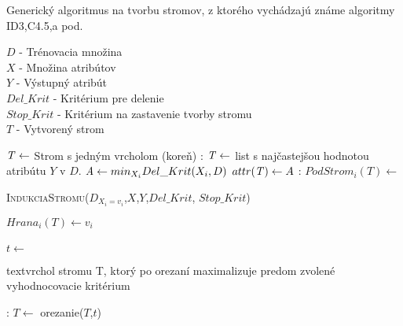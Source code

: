 \begin{algorithm} 
\caption{Generický algoritmus na tvorbu stromov, z ktorého vychádzajú známe algoritmy ID3,C4.5,a pod.}\label{fig:genericAlgoritm}
$D$ - Trénovacia množina \\
$X$ - Množina atribútov \\
$Y$ - Výstupný atribút \\
$Del\_Krit$ - Kritérium pre delenie \\
$Stop\_Krit$ - Kritérium na zastavenie tvorby stromu \\
$T$ - Vytvorený strom 
\begin{algorithmic}
\State $\mathit{T} \gets $ Strom s jedným vrcholom (koreň)
:	  
\State $\mathit{T} \gets $ list s najčastejšou hodnotou atribútu $Y$ v $D$.
\Else
\State $\mathit{A} \gets min_{X_{i}}Del\_Krit(X_{i},D)$
\State $attr(\mathit{T}) \gets A$
\EndIf
{}:
\State $PodStrom_{i}(T) \gets $ \parbox[t]{280pt}{\textsc{IndukciaStromu}($D_{X_{i} = v_{i}}$,$X$,$Y$,$Del\_Krit$, $Stop\_Krit$)} 
\State $Hrana_{i}(T) \gets v_{i}$  
\EndFor \\
\EndFunction
\\
\Repeat 
\State $t \gets$ \parbox[t]{350pt}{textvrchol stromu T, ktorý po orezaní maximalizuje predom zvolené vyhodnocovacie kritérium}
:
\State $T \gets$ orezanie($T$,$t$)
\EndIf
{} \\
\EndFunction
\end{algorithmic}
\end{algorithm}

%

